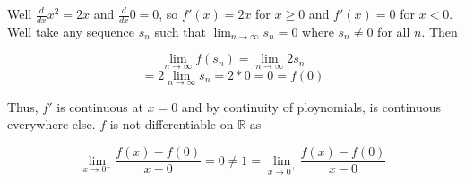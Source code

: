 \begin{solution}
    Well $\frac{d}{dx}x^2=2x$ and $\frac{d}{dx}0=0$, so $f'(x)=2x$ for $x\geq0$ and $f'(x)=0$ for
    $x<0$.\\

    Well take any sequence $s_n$ such that $\lim_{n\rightarrow\infty}s_n=0$ where $s_n\neq0$ for all
    $n$. Then
    
    $$\lim_{n\rightarrow\infty}f(s_n)=\lim_{n\rightarrow\infty}2s_n$$
    $$=2\lim_{n\rightarrow\infty}s_n=2*0=0=f(0)$$
    
    Thus, $f'$ is continuous at $x=0$ and by continuity of ploynomials, is continuous everywhere else.
    $f$ is not differentiable on $\mathbb{R}$ as
    
    $$\lim_{x\rightarrow0^-}\frac{f(x)-f(0)}{x-0}=0\neq1=\lim_{x\rightarrow0^+}\frac{f(x)-f(0)}{x-0}$$

\end{solution}